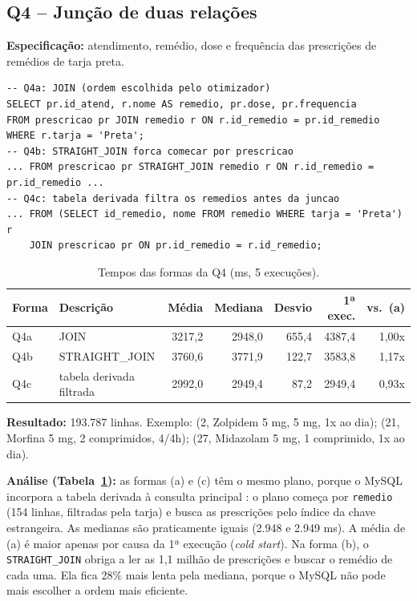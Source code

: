 \documentclass[10pt,a4paper]{article}
\begin{document}
\subsection{Q4 -- Junção de duas relações}
\textbf{Especificação:} atendimento, remédio, dose e frequência das prescrições de remédios de tarja preta.

\begin{lstlisting}
-- Q4a: JOIN (ordem escolhida pelo otimizador)
SELECT pr.id_atend, r.nome AS remedio, pr.dose, pr.frequencia
FROM prescricao pr JOIN remedio r ON r.id_remedio = pr.id_remedio WHERE r.tarja = 'Preta';
-- Q4b: STRAIGHT_JOIN forca comecar por prescricao
... FROM prescricao pr STRAIGHT_JOIN remedio r ON r.id_remedio = pr.id_remedio ...
-- Q4c: tabela derivada filtra os remedios antes da juncao
... FROM (SELECT id_remedio, nome FROM remedio WHERE tarja = 'Preta') r
    JOIN prescricao pr ON pr.id_remedio = r.id_remedio;
\end{lstlisting}

\begin{table}[H]\centering\footnotesize
\caption{Tempos das formas da Q4 (ms, 5 execuções).}\label{tab:q4}
\begin{tabular}{llrrrrr}\toprule
Forma & Descrição & Média & Mediana & Desvio & 1ª exec. & vs.\ (a) \\ \midrule
Q4a & JOIN                     & 3217,2 & 2948,0 & 655,4 & 4387,4 & 1,00x \\
Q4b & STRAIGHT\_JOIN           & 3760,6 & 3771,9 & 122,7 & 3583,8 & 1,17x \\
Q4c & tabela derivada filtrada & 2992,0 & 2949,4 &  87,2 & 2949,4 & 0,93x \\ \bottomrule
\end{tabular}
\end{table}

\textbf{Resultado:} 193.787 linhas. Exemplo: (2, Zolpidem 5 mg, 5 mg, 1x ao dia); (21, Morfina 5 mg, 2 comprimidos, 4/4h); (27, Midazolam 5 mg, 1 comprimido, 1x ao dia).

\textbf{Análise (Tabela~\ref{tab:q4}):} as formas (a) e (c) têm o mesmo plano, porque o MySQL incorpora a tabela derivada à consulta principal \cite{mysql-derived}: o plano começa por \texttt{remedio} (154 linhas, filtradas pela tarja) e busca as prescrições pelo índice da chave estrangeira. As medianas são praticamente iguais (2.948 e 2.949 ms). A média de (a) é maior apenas por causa da 1ª execução (\emph{cold start}). Na forma (b), o \texttt{STRAIGHT\_JOIN} obriga a ler as 1,1 milhão de prescrições e buscar o remédio de cada uma. Ela fica 28\% mais lenta pela mediana, porque o MySQL não pode mais escolher a ordem mais eficiente.
\end{document}
